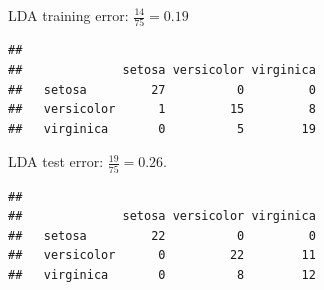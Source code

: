 \documentclass[10pt,ignorenonframetext,]{beamer}
\newenvironment{Shaded}{\begin{snugshade}}{\end{snugshade}}
\newcommand{\KeywordTok}[1]{\textcolor[rgb]{0.13,0.29,0.53}{\textbf{#1}}}
\newcommand{\DataTypeTok}[1]{\textcolor[rgb]{0.13,0.29,0.53}{#1}}
\newcommand{\StringTok}[1]{\textcolor[rgb]{0.31,0.60,0.02}{#1}}
\newcommand{\OperatorTok}[1]{\textcolor[rgb]{0.81,0.36,0.00}{\textbf{#1}}}
\newcommand{\NormalTok}[1]{#1}
\begin{document}
\begin{frame}[fragile]

LDA training error: \(\frac{14}{75} =0.19\)

\scriptsize

\begin{Shaded}
\end{Shaded}

\begin{verbatim}
##             
##              setosa versicolor virginica
##   setosa         27          0         0
##   versicolor      1         15         8
##   virginica       0          5        19
\end{verbatim}

\normalsize

\vspace{2mm}

LDA test error: \(\frac{19}{75} =0.26.\)

\scriptsize

\begin{Shaded}
\end{Shaded}

\begin{verbatim}
##             
##              setosa versicolor virginica
##   setosa         22          0         0
##   versicolor      0         22        11
##   virginica       0          8        12
\end{verbatim}

\end{frame}
\end{document}

